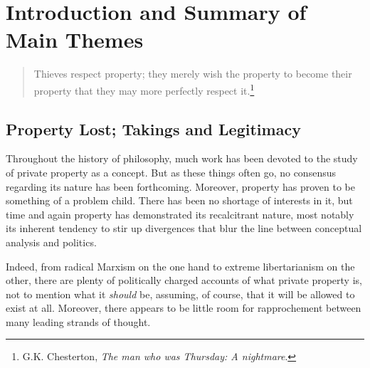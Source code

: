 \documentclass{book} %
\newcommand{\noo}[1]{}
\begin{document}
\chapter{Introduction and Summary of Main Themes}\label{chap:intro}

\begin{quote}
Thieves respect property; they merely wish the property to become their property that they may more perfectly respect it.\footnote{G.K. Chesterton, {\it The man who was Thursday: A nightmare}.}
\end{quote}

\tableofcontents

%
%
%
\section{Property Lost; Takings and Legitimacy}

Throughout the history of philosophy, much work has been devoted to the study of private property as a concept. But as these things often go, no consensus regarding its nature has been forthcoming. Moreover, property has proven to be something of a problem child. There has been no shortage of interests in it, but time and again property has demonstrated its recalcitrant nature, most notably its inherent tendency to stir up divergences that blur the line between conceptual analysis and politics. \noo{This might not be a problem in itself, depending on one's methodological stance, but in practice it has had an unfortunate tendency to disrupt attempts at conducting a principled and inclusive academic debate.}

Indeed, from radical Marxism on the one hand to extreme libertarianism on the other, there are plenty of politically charged accounts of what private property is, not to mention what it {\it should} be, assuming, of course, that it will be allowed to exist at all.
Moreover, there appears to be little room for rapprochement between many leading strands of thought. %
\end{document}
